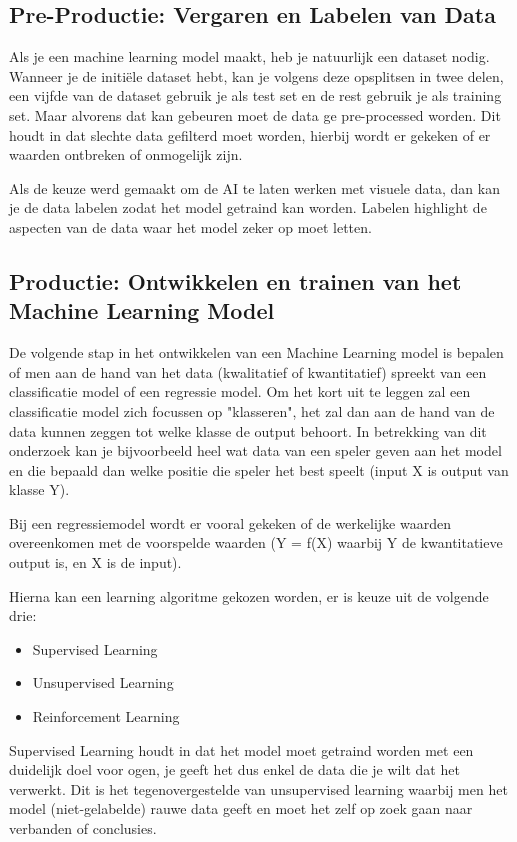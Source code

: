 \documentclass{hogent-article}
\begin{document}
\subsection{Pre-Productie: Vergaren en Labelen van Data}
Als je een machine learning model maakt, heb je natuurlijk een dataset nodig. Wanneer je de initiële dataset hebt, kan je volgens \autocite{BuildMLModel} deze opsplitsen in twee delen, een vijfde van de dataset gebruik je als test set en de rest gebruik je als training set. Maar alvorens dat kan gebeuren moet de data ge pre-processed worden. Dit houdt in dat slechte data gefilterd moet worden, hierbij wordt er gekeken of er waarden ontbreken of onmogelijk zijn. 

Als de keuze werd gemaakt om de AI te laten werken met visuele data, dan kan je de data labelen zodat het model getraind kan worden. Labelen highlight de aspecten van de data waar het model zeker op moet letten.

\subsection{Productie: Ontwikkelen en trainen van het Machine Learning Model}
De volgende stap in het ontwikkelen van een Machine Learning model is bepalen of men aan de hand van het data (kwalitatief of kwantitatief) spreekt van een classificatie model of een regressie model. Om het kort uit te leggen zal een classificatie model zich focussen op "klasseren", het zal dan aan de hand van de data kunnen zeggen tot welke klasse de output behoort. In betrekking van dit onderzoek kan je bijvoorbeeld heel wat data van een speler geven aan het model en die bepaald dan welke positie die speler het best speelt (input X is output van klasse Y).

Bij een regressiemodel wordt er vooral gekeken of de werkelijke waarden overeenkomen met de voorspelde waarden (Y = f(X) waarbij Y de kwantitatieve output is, en X is de input).

Hierna kan een learning algoritme gekozen worden, er is keuze uit de volgende drie: 
\begin{itemize}
	\item Supervised Learning
	\item Unsupervised Learning
	\item Reinforcement Learning
\end{itemize}

Supervised Learning houdt in dat het model moet getraind worden met een duidelijk doel voor ogen, je geeft het dus enkel de data die je wilt dat het verwerkt. Dit is het tegenovergestelde van unsupervised learning waarbij men het model (niet-gelabelde) rauwe data geeft en moet het zelf op zoek gaan naar verbanden of conclusies.
\end{document}
